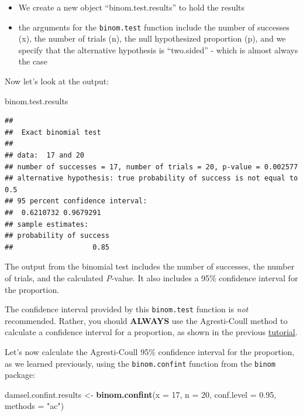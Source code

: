 \documentclass[
]{book}
\newenvironment{Shaded}{\begin{snugshade}}{\end{snugshade}}
\newcommand{\AttributeTok}[1]{\textcolor[rgb]{0.13,0.29,0.53}{#1}}
\newcommand{\DecValTok}[1]{\textcolor[rgb]{0.00,0.00,0.81}{#1}}
\newcommand{\FloatTok}[1]{\textcolor[rgb]{0.00,0.00,0.81}{#1}}
\newcommand{\FunctionTok}[1]{\textcolor[rgb]{0.13,0.29,0.53}{\textbf{#1}}}
\newcommand{\NormalTok}[1]{#1}
\newcommand{\OtherTok}[1]{\textcolor[rgb]{0.56,0.35,0.01}{#1}}
\newcommand{\StringTok}[1]{\textcolor[rgb]{0.31,0.60,0.02}{#1}}
\providecommand{\tightlist}{%
  \setlength{\itemsep}{0pt}\setlength{\parskip}{0pt}}
\begin{document}
\begin{itemize}
\tightlist
\item
  We create a new object ``binom.test.results'' to hold the results
\item
  the arguments for the \texttt{binom.test} function include the number of successes (x), the number of trials (n), the null hypothesized proportion (p), and we specify that the alternative hypothesis is ``two.sided'' - which is almost always the case
\end{itemize}

Now let's look at the output:

\begin{Shaded}
\begin{Highlighting}[]
\NormalTok{binom.test.results}
\end{Highlighting}
\end{Shaded}

\begin{verbatim}
## 
##  Exact binomial test
## 
## data:  17 and 20
## number of successes = 17, number of trials = 20, p-value = 0.002577
## alternative hypothesis: true probability of success is not equal to 0.5
## 95 percent confidence interval:
##  0.6210732 0.9679291
## sample estimates:
## probability of success 
##                   0.85
\end{verbatim}

The output from the binomial test includes the number of successes, the number of trials, and the calculated \emph{P}-value. It also includes a 95\% confidence interval for the proportion.

The confidence interval provided by this \texttt{binom.test} function is \emph{not} recommended. Rather, you should \textbf{ALWAYS} use the Agresti-Coull method to calculate a confidence interval for a proportion, as shown in the previous \hyperref[confint_prop]{tutorial}.

Let's now calculate the Agresti-Coull 95\% confidence interval for the proportion, as we learned previously, using the \texttt{binom.confint} function from the \texttt{binom} package:

\begin{Shaded}
\begin{Highlighting}[]
\NormalTok{damsel.confint.results }\OtherTok{\textless{}{-}} \FunctionTok{binom.confint}\NormalTok{(}\AttributeTok{x =} \DecValTok{17}\NormalTok{, }\AttributeTok{n =} \DecValTok{20}\NormalTok{, }\AttributeTok{conf.level =} \FloatTok{0.95}\NormalTok{, }\AttributeTok{methods =} \StringTok{"ac"}\NormalTok{)}
\end{Highlighting}
\end{Shaded}
\end{document}
